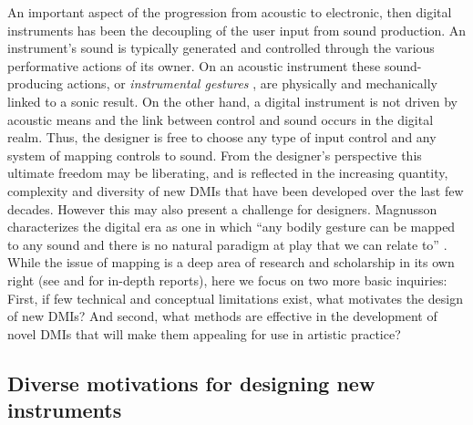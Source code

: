 \documentclass[letterpaper, 12pt]{article}
\begin{document}
An important aspect of the progression from acoustic to electronic, then digital instruments has been the decoupling of the user input from sound production. An instrument's sound is typically generated and controlled through the various performative actions of its owner.
On an acoustic instrument these sound-producing actions, or \emph{instrumental gestures} \citep{Cadoz1988}, are physically and mechanically linked to a sonic result. On the other hand, a digital instrument is not driven by acoustic means and the link between control and sound occurs in the digital realm. Thus, the designer is free to choose any type of input control and any system of mapping controls to sound. From the designer's perspective this ultimate freedom may be liberating, and is reflected in the increasing quantity, complexity and diversity of new DMIs that have been developed over the last few decades. However this may also present a challenge for designers. Magnusson characterizes the digital era as one in which ``any bodily gesture can be mapped to any sound and there is no natural paradigm at play that we can relate to'' \citep*[p. 34]{Magnusson2019}. While the issue of mapping is a deep area of research and scholarship in its own right (see \citet{os-mapping-2002} and \citet{cmj-mapping-2014} for in-depth reports), here we focus on two more basic inquiries: First, if few technical and conceptual limitations exist, what motivates the design of new DMIs? And second, what methods are effective in the development of novel DMIs that will make them appealing for use in artistic practice?

\subsection{Diverse motivations for designing new instruments}
\label{ch3-sec:diverse-motivations-for-designing-new-instruments}
\end{document}
